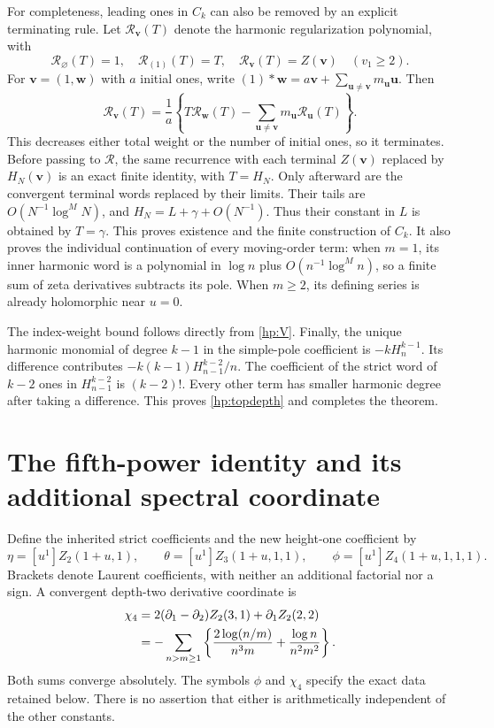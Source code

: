 For completeness, leading ones in $C_k$ can also be removed by an
explicit terminating rule. Let $\mathcal R_{\mathbf v}(T)$ denote
the harmonic regularization polynomial, with
\[
 \mathcal R_\varnothing(T)=1,\quad \mathcal R_{(1)}(T)=T,
 \quad\mathcal R_{\mathbf v}(T)=Z(\mathbf v)\quad(v_1\ge2).
\]
For $\mathbf v=(1,\mathbf w)$ with $a$ initial ones, write
$(1)*\mathbf w=a\mathbf v+\sum_{\mathbf u\ne\mathbf v}
m_{\mathbf u}\mathbf u$. Then
\begin{equation}\label{hp:regularization}
 \mathcal R_{\mathbf v}(T)=\frac1a
  \left\{T\mathcal R_{\mathbf w}(T)
       -\sum_{\mathbf u\ne\mathbf v}m_{\mathbf u}
                         \mathcal R_{\mathbf u}(T)\right\}.
\end{equation}
This decreases either total weight or the number of initial ones,
so it terminates. Before passing to $\mathcal R$, the same recurrence
with each terminal $Z(\mathbf v)$ replaced by $H_N(\mathbf v)$
is an exact finite identity, with $T=H_N$. Only afterward are the
convergent terminal words replaced by their limits. Their tails are
$O(N^{-1}\log^M N)$, and $H_N=L+\gamma+O(N^{-1})$.
Thus their constant in $L$ is obtained by $T=\gamma$.
This proves existence and the finite construction of $C_k$.
It also proves the individual continuation of every moving-order term:
when $m=1$, its inner harmonic word is a polynomial in $\log n$
plus $O(n^{-1}\log^M n)$, so a finite sum of zeta derivatives
subtracts its pole. When $m\ge2$, its defining series is already
holomorphic near $u=0$.

The index-weight bound follows directly from \eqref{hp:V}. Finally,
the unique harmonic monomial of degree $k-1$ in the simple-pole
coefficient is $-kH_n^{k-1}$. Its difference contributes
$-k(k-1)H_{n-1}^{k-2}/n$. The coefficient of the strict word of
$k-2$ ones in $H_{n-1}^{k-2}$ is $(k-2)!$.
Every other term has smaller harmonic degree after taking a
difference. This proves \eqref{hp:topdepth} and completes the theorem.

\section{The fifth-power identity and its additional spectral coordinate}
\label{hp:sec:fifth}

Define the inherited strict coefficients and the new height-one
coefficient by
\begin{equation}\label{hp:heightcoeffs}
 \eta=[u^1]Z_2(1+u,1),\qquad
 \theta=[u^1]Z_3(1+u,1,1),\qquad
 \phi=[u^1]Z_4(1+u,1,1,1).
\end{equation}
Brackets denote Laurent coefficients, with neither an additional
factorial nor a sign. A convergent depth-two derivative coordinate is
\begin{align}
 \chi_4&=2(\partial_1-\partial_2)Z_2(3,1)
                         +\partial_1Z_2(2,2)\label{hp:chi}\\
 &=-\sum_{n>m\ge1}\left\{
       \frac{2\log(n/m)}{n^3m}+\frac{\log n}{n^2m^2}\right\}.
       \notag
\end{align}
Both sums converge absolutely. The symbols $\phi$ and $\chi_4$ specify
the exact data retained below. There is no assertion that either is
arithmetically independent of the other constants.

